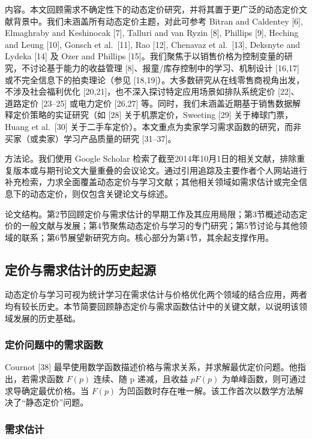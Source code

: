 内容。本文回顾需求不确定性下的动态定价研究，并将其置于更广泛的动态定价文献背景中。我们未涵盖所有动态定价主题，对此可参考 Bitran and Caldentey [6], Elmaghraby and Keshinocak [7], Talluri and van Ryzin [8], Phillips [9], Heching and Leung [10], Gonsch et al.~[11], Rao [12], Chenavaz et al.~[13], Deksnyte and Lydeka [14] 及 Ozer and Phillips [15]。我们聚焦于以销售价格为控制变量的研究，不讨论基于能力的收益管理 [8]、报童/库存控制中的学习、机制设计 [16,17] 或不完全信息下的拍卖理论（参见 [18,19]）。大多数研究从在线零售商视角出发，不涉及社会福利优化 [20,21]，也不深入探讨特定应用场景如排队系统定价 [22]、道路定价 [23–25] 或电力定价 [26,27] 等。同时，我们未涵盖近期基于销售数据解释定价策略的实证研究（如 [28] 关于机票定价，Sweeting [29] 关于棒球门票，Huang et al.~[30] 关于二手车定价）。本文重点为卖家学习需求函数的研究，而非买家（或卖家）学习产品质量的研究 [31–37]。

方法论。我们使用 Google Scholar 检索了截至2014年10月1日的相关文献，排除重复版本或与期刊论文大量重叠的会议论文。通过引用追踪及主要作者个人网站进行补充检索，力求全面覆盖动态定价与学习文献；其他相关领域如需求估计或完全信息下的动态定价，则仅包含关键论文与综述。

论文结构。第2节回顾定价与需求估计的早期工作及其应用局限；第3节概述动态定价的一般文献与发展；第4节聚焦动态定价与学习的专门研究；第5节讨论与其他领域的联系；第6节展望新研究方向。核心部分为第4节，其余起支撑作用。


\subsection{定价与需求估计的历史起源}\label{historical-origins-of-pricing-and-demand-estimation}

动态定价与学习可视为统计学习在需求估计与价格优化两个领域的结合应用，两者均有较长历史。本节简要回顾静态定价与需求函数估计中的关键文献，以说明该领域发展的历史基础。

\subsubsection{定价问题中的需求函数}\label{demand-functions-in-pricing-problems}

Cournot [38] 最早使用数学函数描述价格与需求关系，并求解最优定价问题。他指出，若需求函数 \(F(p)\) 连续、随 p 递减，且收益 \(pF(p)\) 为单峰函数，则可通过求导确定最优价格。当 \(F(p)\) 为凹函数时存在唯一解。该工作首次以数学方法解决了“静态定价”问题。

\subsubsection{需求估计}\label{demand-estimation}

